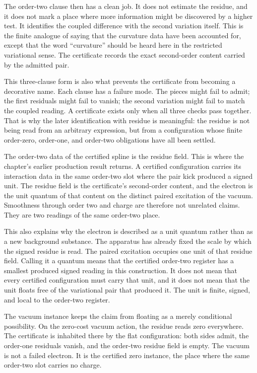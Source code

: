 The order-two clause then has a clean job. It does not estimate the residue, and
it does not mark a place where more information might be discovered by a higher
test. It identifies the coupled difference with the second variation itself.
This is the finite analogue of saying that the curvature data have been
accounted for, except that the word ``curvature'' should be heard here in the
restricted variational sense. The certificate records the exact second-order
content carried by the admitted pair.

This three-clause form is also what prevents the certificate from becoming a
decorative name. Each clause has a failure mode. The pieces might fail to admit;
the first residuals might fail to vanish; the second variation might fail to
match the coupled reading. A certificate exists only when all three checks pass
together. That is why the later identification with residue is meaningful: the
residue is not being read from an arbitrary expression, but from a configuration
whose finite order-zero, order-one, and order-two obligations have all been
settled.

The order-two data of the certified spline is the residue field. This is where
the chapter's earlier production result returns. A certified configuration
carries its interaction data in the same order-two slot where the pair kick
produced a signed unit. The residue field is the certificate's second-order
content, and the electron is the unit quantum of that content on the distinct
paired excitation of the vacuum. Smoothness through order two and charge are
therefore not unrelated claims. They are two readings of the same order-two
place.

This also explains why the electron is described as a unit quantum rather than
as a new background substance. The apparatus has already fixed the scale by
which the signed residue is read. The paired excitation occupies one unit of
that residue field. Calling it a quantum means that the certified order-two
register has a smallest produced signed reading in this construction. It does
not mean that every certified configuration must carry that unit, and it does
not mean that the unit floats free of the variational pair that produced it.
The unit is finite, signed, and local to the order-two register.

The vacuum instance keeps the claim from floating as a merely conditional
possibility. On the zero-cost vacuum action, the residue reads zero everywhere.
The certificate is inhabited there by the flat configuration: both sides admit,
the order-one residuals vanish, and the order-two residue field is empty. The
vacuum is not a failed electron. It is the certified zero instance, the place
where the same order-two slot carries no charge.

